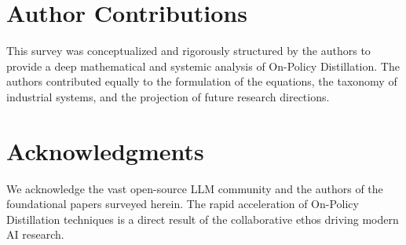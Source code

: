 \documentclass{article} %
\begin{document}
\section*{Author Contributions}
This survey was conceptualized and rigorously structured by the authors to provide a deep mathematical and systemic analysis of On-Policy Distillation. The authors contributed equally to the formulation of the equations, the taxonomy of industrial systems, and the projection of future research directions.

\section*{Acknowledgments}
We acknowledge the vast open-source LLM community and the authors of the foundational papers surveyed herein. The rapid acceleration of On-Policy Distillation techniques is a direct result of the collaborative ethos driving modern AI research.



\end{document}

